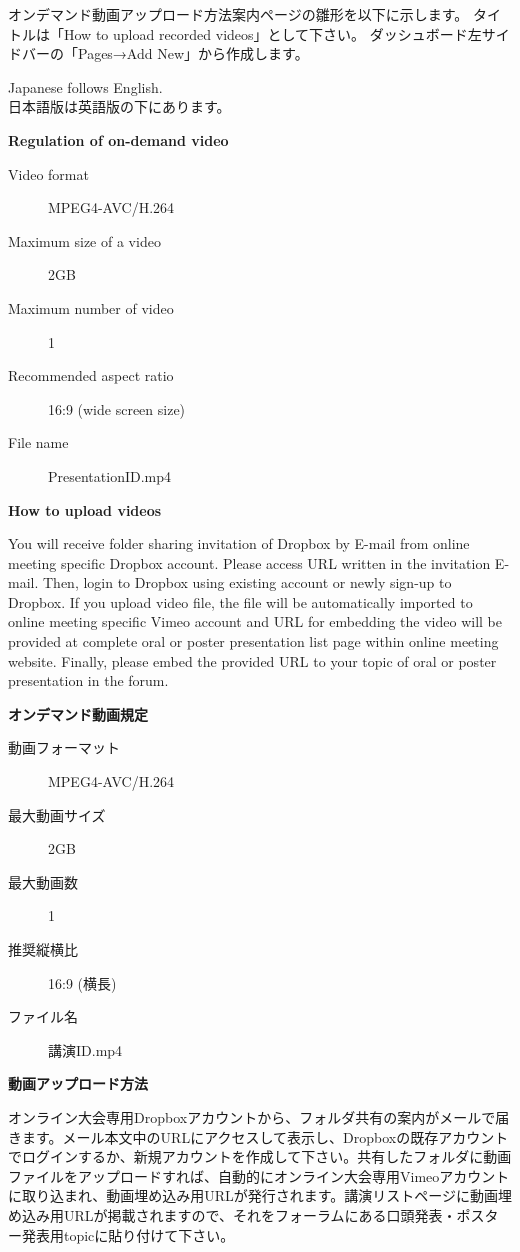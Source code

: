 \documentclass[titlepage,10pt,a4paper,uplatex]{jsbook}
\newenvironment{content}{\begin{shaded}\vspace{-1em}\raggedright\ttfamily\footnotesize\setlength{\baselineskip}{1.4em}}{\end{shaded}\vspace{-1em}}
\renewcommand{\textbf}[1]{{\bfseries\sffamily#1}}
\begin{document}
オンデマンド動画アップロード方法案内ページの雛形を以下に示します。
タイトルは「How to upload recorded videos」として下さい。
ダッシュボード左サイドバーの「Pages→Add New」から作成します。

\begin{content}
Japanese follows English.\\
日本語版は英語版の下にあります。

\textbf{\Large Regulation of on-demand video}

\begin{description}
\item[Video format] MPEG4-AVC/H.264
\item[Maximum size of a video] 2GB
\item[Maximum number of video] 1
\item[Recommended aspect ratio] 16:9 (wide screen size)
\item[File name] PresentationID.mp4
\end{description}

\textbf{\Large How to upload videos}

You will receive folder sharing invitation of Dropbox by E-mail from online meeting specific Dropbox account. Please access URL written in the invitation E-mail. Then, login to Dropbox using existing account or newly sign-up to Dropbox. If you upload video file, the file will be automatically imported to online meeting specific Vimeo account and URL for embedding the video will be provided at complete oral or poster presentation list page within online meeting website. Finally, please embed the provided URL to your topic of oral or poster presentation in the forum.

\textbf{\Large オンデマンド動画規定}

\begin{description}
\item[動画フォーマット] MPEG4-AVC/H.264
\item[最大動画サイズ] 2GB
\item[最大動画数] 1
\item[推奨縦横比] 16:9 (横長)
\item[ファイル名] 講演ID.mp4
\end{description}

\textbf{\Large 動画アップロード方法}

オンライン大会専用Dropboxアカウントから、フォルダ共有の案内がメールで届きます。メール本文中のURLにアクセスして表示し、Dropboxの既存アカウントでログインするか、新規アカウントを作成して下さい。共有したフォルダに動画ファイルをアップロードすれば、自動的にオンライン大会専用Vimeoアカウントに取り込まれ、動画埋め込み用URLが発行されます。講演リストページに動画埋め込み用URLが掲載されますので、それをフォーラムにある口頭発表・ポスター発表用topicに貼り付けて下さい。
\end{content}
\end{document}
